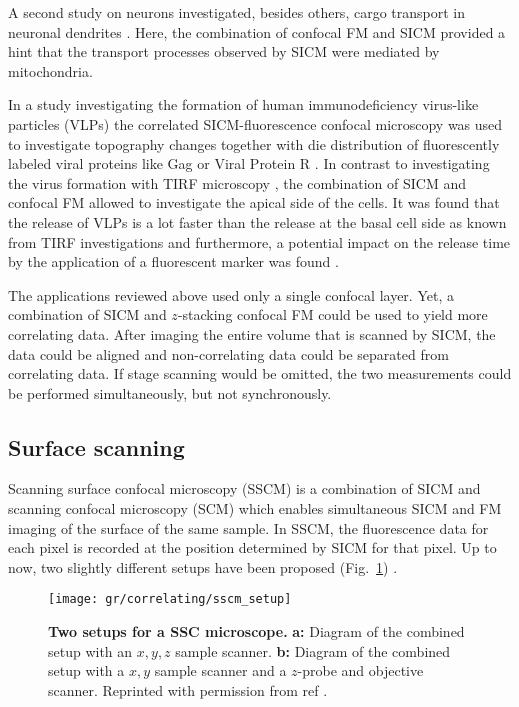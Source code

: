 A second study on neurons investigated, besides others, cargo transport in
neuronal dendrites \cite{Takahashi2019}. Here, the combination of
confocal FM and SICM provided a hint that the transport processes observed by
SICM were mediated by mitochondria.


In a study investigating the formation of human immunodeficiency virus-like
particles (VLPs) the correlated SICM-fluorescence confocal microscopy was used
to investigate topography changes together with die distribution of
fluorescently labeled viral proteins like Gag or Viral Protein R
\cite{Bednarska2020}. In contrast to investigating the virus formation with
TIRF microscopy \cite{Jouvenet2008}, the combination of SICM and confocal FM
allowed to investigate the apical side of the cells. It was found that the
release of VLPs is a lot faster than the release at the basal cell side as
known from TIRF investigations and furthermore, a potential impact on the
release time by the application of a fluorescent marker was found
\cite{Bednarska2020}.

The applications reviewed above used only a single confocal layer. Yet,
a combination of SICM and $z$-stacking confocal FM could be used to yield more
correlating data. After imaging the entire volume that is scanned by SICM, the
data could be aligned and non-correlating data could be separated from
correlating data. If stage scanning would be omitted, the two measurements
could be performed simultaneously, but not synchronously.  


\subsection{Surface scanning}

Scanning surface confocal microscopy (SSCM) \cite{Gorelik2002a} is a
combination of SICM and scanning confocal microscopy (SCM) which enables
simultaneous SICM and FM imaging of the surface of the same sample. In SSCM,
the fluorescence data for each pixel is recorded at the position determined by
SICM for that pixel. Up to now, two slightly different setups have been proposed
(Fig.~\ref{fig:sscm_setup}) \cite{Gorelik2002a,Shevchuk2013}.

\begin{figure}
  \texttt{[image: gr/correlating/sscm\_setup]}

  \caption{%
    \textbf{Two setups for a SSC microscope.}
    \textbf{a:} Diagram of the combined setup with an $x,y,z$ sample scanner.
    \textbf{b:} Diagram of the combined setup with a $x,y$ sample scanner and
    a $z$-probe and objective scanner. 
    Reprinted with permission from ref \cite{Shevchuk2013}.
  }
  \label{fig:sscm_setup}
\end{figure}

